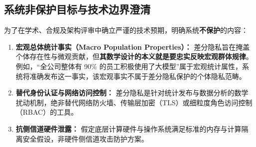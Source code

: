 \subsection{系统非保护目标与技术边界澄清}
为了在学术、合规及架构评审中确立严谨的技术预期，明确系统\textbf{不保护}的内容：
\begin{enumerate}[label=(\arabic*), leftmargin=2em]
  \item \textbf{宏观总体统计事实（Macro Population Properties）：} 差分隐私旨在掩盖个体存在性与微观贡献，但\textbf{其数学设计的本义就是要忠实反映宏观群体规律}。例如，“全公司整体有 90\% 的员工积极使用了大模型”属于宏观统计属性，系统将准确发布这一事实，该宏观事实不属于差分隐私保护的个体隐私范畴。
  \item \textbf{替代身份认证与网络访问控制：} 差分隐私是针对统计发布与数据分析的数学扰动机制，绝非替代网络防火墙、传输层加密（TLS）或细粒度角色访问控制（RBAC）的工具。
  \item \textbf{抗侧信道硬件泄露：} 假定底层计算硬件与操作系统满足标准的内存与计算隔离安全假设，非硬件侧信道攻击防护方案。
\end{enumerate}
